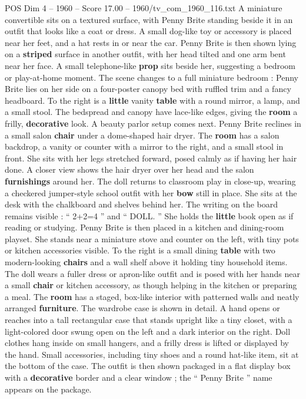 \begin{textsample}{POS Dim 4 – 1960 – Score 17.00 – 1960/tv\_com\_1960\_116.txt}
A miniature convertible sits on a textured surface, with Penny Brite standing beside it in an outfit that looks like a coat or dress.
A small dog-like toy or accessory is placed near her feet, and a hat rests in or near the car.
Penny Brite is then shown lying on a \textbf{striped} surface in another outfit, with her head tilted and one arm bent near her face.
A small telephone-like \textbf{prop} sits beside her, suggesting a bedroom or play-at-home moment.
The scene changes to a full miniature bedroom : Penny Brite lies on her side on a four-poster canopy bed with ruffled trim and a fancy headboard.
To the right is a \textbf{little} vanity \textbf{table} with a round mirror, a lamp, and a small stool.
The bedspread and canopy have lace-like edges, giving the \textbf{room} a frilly, \textbf{decorative} look.
A beauty parlor setup comes next.
Penny Brite reclines in a small salon \textbf{chair} under a dome-shaped hair dryer.
The \textbf{room} has a salon backdrop, a vanity or counter with a mirror to the right, and a small stool in front.
She sits with her legs stretched forward, posed calmly as if having her hair done.
A closer view shows the hair dryer over her head and the salon \textbf{furnishings} around her.
The doll returns to classroom play in close-up, wearing a checkered jumper-style school outfit with her \textbf{bow} still in place.
She sits at the desk with the chalkboard and shelves behind her.
The writing on the board remains visible : “ 2+2=4 ” and “ DOLL. ” She holds the \textbf{little} book open as if reading or studying.
Penny Brite is then placed in a kitchen and dining-room playset.
She stands near a miniature stove and counter on the left, with tiny pots or kitchen accessories visible.
To the right is a small dining \textbf{table} with two modern-looking \textbf{chairs} and a wall shelf above it holding tiny household items.
The doll wears a fuller dress or apron-like outfit and is posed with her hands near a small \textbf{chair} or kitchen accessory, as though helping in the kitchen or preparing a meal.
The \textbf{room} has a staged, box-like interior with patterned walls and neatly arranged \textbf{furniture}.
The wardrobe case is shown in detail.
A hand opens or reaches into a tall rectangular case that stands upright like a tiny closet, with a light-colored door swung open on the left and a dark interior on the right.
Doll clothes hang inside on small hangers, and a frilly dress is lifted or displayed by the hand.
Small accessories, including tiny shoes and a round hat-like item, sit at the bottom of the case.
The outfit is then shown packaged in a flat display box with a \textbf{decorative} border and a clear window ; the “ Penny Brite ” name appears on the package.

\end{textsample}
